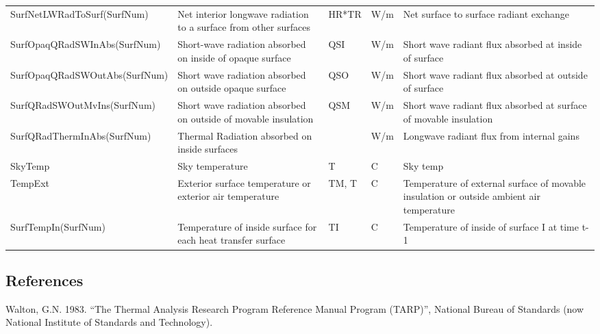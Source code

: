 {\begin{longtable}[c]{p{1.8in}p{1.2in}p{0.9in}p{0.9in}p{1.2in}}
SurfNetLWRadToSurf(SurfNum) & Net interior longwave radiation to a surface from other surfaces & HR*TR & W/m & Net surface to surface radiant exchange \tabularnewline
SurfOpaqQRadSWInAbs(SurfNum) & Short-wave radiation absorbed on inside of opaque surface & QSI & W/m & Short wave radiant flux absorbed at inside of surface \tabularnewline
SurfOpaqQRadSWOutAbs(SurfNum) & Short wave radiation absorbed on outside opaque surface & QSO & W/m & Short wave radiant flux absorbed at outside of surface \tabularnewline
SurfQRadSWOutMvIns(SurfNum) & Short wave radiation absorbed on outside of movable insulation & QSM & W/m & Short wave radiant flux absorbed at surface of movable insulation \tabularnewline
SurfQRadThermInAbs(SurfNum) & Thermal Radiation absorbed on inside surfaces & ~ & W/m & Longwave radiant flux from internal gains \tabularnewline
SkyTemp & Sky temperature & T & C & Sky temp \tabularnewline
TempExt & Exterior surface temperature or exterior air temperature & TM, T & C & Temperature of external surface of movable insulation or outside ambient air temperature \tabularnewline
SurfTempIn(SurfNum) & Temperature of inside surface for each heat transfer surface & TI & C & Temperature of inside of surface I at time t-1 \tabularnewline
\bottomrule
\end{longtable}}

\subsection{References}\label{references-044}

Walton, G.N. 1983. ``The Thermal Analysis Research Program Reference Manual Program (TARP)'', National Bureau of Standards (now National Institute of Standards and Technology).
